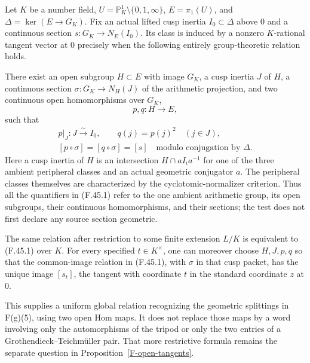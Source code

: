 \begin{theorem}
\label{F-two-Hom-tangents}
Let $K$ be a number field, $U=\mathbb P^1_K\setminus\{0,1,\infty\}$,
$E=\pi_1(U)$, and $\Delta=\ker(E\to G_K)$. Fix an actual lifted
cusp inertia $I_0\subset\Delta$ above $0$ and a continuous section
$s:G_K\to N_E(I_0)$. Its class is induced by a nonzero
$K$-rational tangent vector at $0$ precisely when the following
entirely group-theoretic relation holds.

There exist an open subgroup $H\subset E$ with image $G_K$, a cusp
inertia $J$ of $H$, a continuous section
$\sigma:G_K\to N_H(J)$ of the arithmetic projection, and two
continuous open homomorphisms over $G_K$,
\[
                       p,q:H\longrightarrow E,
\]
such that
\[
 \begin{gathered}
 p|_J:J\xrightarrow{\sim} I_0,\qquad
 q(j)=p(j)^2\quad(j\in J),\\
             [p\circ\sigma]=[q\circ\sigma]=[s]
       \quad\text{modulo conjugation by }\Delta.
 \tag{F.45.1}
 \end{gathered}
\]
Here a cusp inertia of $H$ is an intersection
$H\cap aI_i a^{-1}$ for one of the three ambient peripheral
classes and an actual geometric conjugator $a$. The peripheral
classes themselves are characterized by the cyclotomic-normalizer
criterion. Thus all the quantifiers in (F.45.1) refer to the one
ambient arithmetic group, its open subgroups, their continuous
homomorphisms, and their sections; the test does not first declare
any source section geometric.

The same relation after restriction to some finite extension
$L/K$ is equivalent to (F.45.1) over $K$. For every specified
$t\in K^\times$, one can moreover choose $H,J,p,q$ so that the
common-image relation in (F.45.1), with $\sigma$ in that cusp
packet, has the unique image $[s_t]$, the tangent with coordinate
$t$ in the standard coordinate $z$ at $0$.

This supplies a uniform global relation recognizing the geometric
splittings in F(g)(5), using two open Hom maps. It does not replace
those maps by a word involving only the automorphisms of the
tripod or only the two entries of a Grothendieck--Teichm\"uller
pair. That more restrictive formula remains the separate question
in Proposition~\ref{F-open-tangents}.
\end{theorem}
